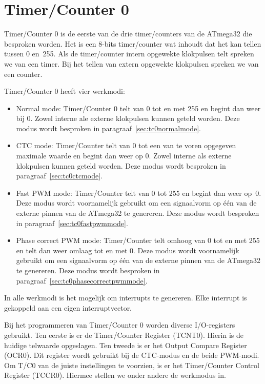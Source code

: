 \section{Timer/Counter 0}

Timer/Counter 0 is de eerste van de drie timer/counters van de ATmega32 die
besproken worden. Het is een 8-bits timer/counter wat inhoudt dat het kan tellen
tussen 0 en~255. Als de timer/counter intern opgewekte klokpulsen telt spreken
we van een timer. Bij het tellen van extern opgewekte klokpulsen spreken
we van een counter.

Timer/Counter 0 heeft vier werkmodi:

\begin{itemize}
\item Normal mode: Timer/Counter 0 telt van 0 tot en met 255 en begint dan
weer bij 0. Zowel interne ale externe klokpulsen kunnen geteld worden. Deze
modus wordt besproken in paragraaf~\ref{sec:tc0normalmode}.

\item CTC mode: Timer/Counter telt van 0 tot een van te voren opgegeven
maximale waarde en begint dan weer op 0. Zowel interne als externe klokpulsen
kunnen geteld worden. Deze modus wordt besproken in
paragraaf~\ref{sec:tc0ctcmode}.

\item Fast PWM mode: Timer/Counter telt van 0 tot 255 en begint dan weer op~0.
Deze modus wordt voornamelijk gebruikt om een signaalvorm op \'e\'en van de externe
pinnen van de ATmega32 te genereren. Deze modus wordt besproken in
paragraaf~\ref{sec:tc0fastpwmmode}.

\item Phase correct PWM mode: Timer/Counter telt omhoog van 0 tot en met 255
en telt dan weer omlaag tot en met 0. Deze modus wordt voornamelijk gebruikt om een
signaalvorm op \'e\'en van de externe pinnen van de ATmega32 te genereren.
Deze modus wordt besproken in paragraaf~\ref{sec:tc0phasecorrectpwmmode}.
\end{itemize}

In alle werkmodi is het mogelijk om interrupts te genereren. Elke interrupt
is gekoppeld aan een eigen interruptvector.

Bij het programmeren van Timer/Counter 0 worden diverse I/O-registers
gebruikt. Ten eerste is er de Timer/Counter Register (TCNT0). Hierin is de
huidige telwaarde opgeslagen. Ten tweede is er het Output Compare
Register (OCR0). Dit register wordt gebruikt bij de CTC-modus en de beide
PWM-modi. Om T/C0 van de juiste instellingen te voorzien, is er het
Timer/Counter Control Register (TCCR0). Hiermee stellen we onder andere de
werkmodus in.

